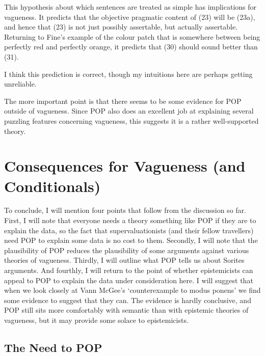 This hypothesis about which sentences are treated as simple has implications for vagueness. It predicts that the objective pragmatic content of  (23) will be (23a), and hence that (23) is not just possibly assertable, but actually assertable. Returning to Fine's example of the colour patch that is somewhere between being perfectly red and perfectly orange, it predicts that (30) should sound better than (31).


\noindent I think this prediction is correct, though my intuitions here are perhaps getting unreliable.

The more important point is that there seems to be some evidence for POP outside of vagueness. Since POP also does an excellent job at explaining several puzzling features concerning vagueness, this suggests it is a rather well-supported theory. 

\section{Consequences for Vagueness (and Conditionals)}

To conclude, I will mention four points that follow from the discussion so far. First, I will note that everyone needs a theory something like POP if they are to explain the data, so the fact that supervaluationists (and their fellow travellers) need POP to explain some data is no cost to them. Secondly, I will note that the plausibility of POP reduces the plausibility of some arguments against various theories of vagueness. Thirdly, I will outline what POP tells us about Sorites arguments. And fourthly, I will return to the point of whether epistemicists can appeal to POP to explain the data under consideration here. I will suggest that when we look closely at Vann McGee's `counterexample to modus ponens' we find some evidence to suggest that they can. The evidence is hardly conclusive, and POP still sits more comfortably with semantic than with epistemic theories of vagueness, but it may provide some solace to epistemicists.

\subsection{The Need to POP}

